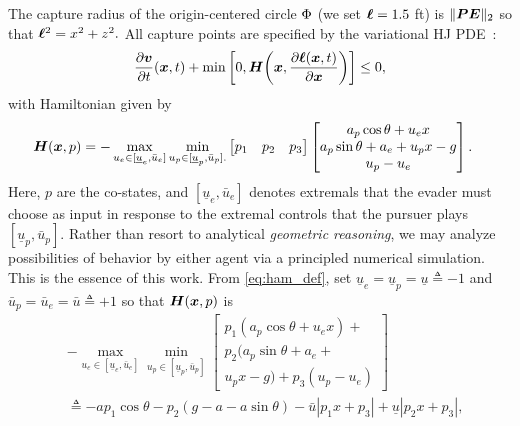 The capture radius of the origin-centered circle $\Phi$ (we set $\bm{\ell}=1.5$ ft) is $\|\bm{P} \bm{E}\|_2 $ so that $\bm{\ell}^2 =  x^2 + z^2.$
%
All capture points are specified by  the variational HJ PDE~\citet{Mitchell2005}:
%
\begin{align}
\dfrac{\partial \bm{v}}{\partial t} (\bm{x},t) + \min \left[0, \bm{H}\bigg(\bm{x}, \frac{\partial \bm{\ell}(\bm{x}, t)}{\partial \bm{x}}\bigg)\right] \le 0,
\label{eq:rockets_hji}
\end{align}
%
with Hamiltonian given by
%
\begin{align}
\hamfunc(\state, p) &= -\max_{u_e \in [\underline{u}_e, \bar{u}_e]} \min_{u_p \in [\underline{u}_p, \bar{u}_p].
} \begin{bmatrix}
p_1 & p_2 & p_3
\end{bmatrix} 
%
\begin{bmatrix}
a_p \cos \theta + u_e x \\
a_p \sin \theta + a_e + u_p x - g \\
u_p -u_e
\end{bmatrix}.
\label{eq:ham_def}
\end{align}
%
Here,  $p$ are the co-states, and $[\underline{u}_e, \bar{u}_e]$ denotes extremals that the evader must choose as input in response to the extremal controls that the pursuer plays \ie $[\underline{u}_p, \bar{u}_p]$. 
%
Rather than resort to analytical \textit{geometric reasoning}, we may analyze possibilities of behavior by either agent via a principled numerical simulation. This is the essence of this work. 
From \eqref{eq:ham_def}, set $\underline{u}_e = \underline{u}_p = \underline{u} \triangleq -1$ and $\bar{u}_p = \bar{u}_e = \bar{u} \triangleq +1$ so that $\bm{H}(\bm{x}, p)$ is
%
\begin{align}
& -\max_{u_e \in [\underline{u}_e, \bar{u}_e]} \min_{u_p \in [\underline{u}_p, \bar{u}_p]
} 
\begin{bmatrix}
p_1(a_p \cos \theta + u_e x) + \nonumber \\ p_2 (a_p \sin \theta + a_e + \nonumber \\ u_p x - g) + p_3 (u_p -u_e)
\end{bmatrix} \nonumber \\
%
%
&\triangleq -a p_1 \cos \theta - p_2 (g - a - a\sin \theta) -\bar{u} |p_1 x +  p_3 |  + \underline{u} |p_2 x + p_3 |,
\label{eq:rocket_hamfunc}
\end{align}
